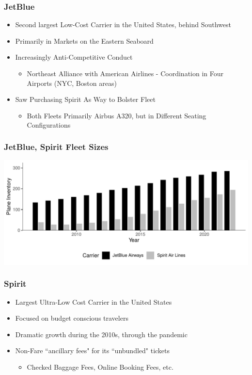 \documentclass[xcolor=dvipsnames]{beamer}
\begin{document}
    \begin{frame}
        \frametitle{JetBlue}
        \begin{itemize}
            \item Second largest Low-Cost Carrier in the United States, behind Southwest
            \item Primarily in Markets on the Eastern Seaboard
            \item Increasingly Anti-Competitive Conduct
            \begin{itemize}
                \item Northeast Alliance with American Airlines - Coordination in Four Airports (NYC, Boston areas)
            \end{itemize}
            \item Saw Purchasing Spirit As Way to Bolster Fleet
            \begin{itemize}
                \item Both Fleets Primarily Airbus A320, but in Different Seating Configurations
            \end{itemize}
        \end{itemize}
    \end{frame}

    \begin{frame}
        \frametitle{JetBlue, Spirit Fleet Sizes}
        \includegraphics[width = \linewidth]{Both_Planes.pdf}
    \end{frame}


    \begin{frame}
        \frametitle{Spirit}
        \begin{itemize}
            \item Largest Ultra-Low Cost Carrier in the United States
            \item Focused on budget conscious travelers
            \item Dramatic growth during the 2010s, through the pandemic
            \item Non-Fare ``ancillary fees" for its ``unbundled" tickets
            \begin{itemize}
                \item Checked Baggage Fees, Online Booking Fees, etc.
            \end{itemize}
        \end{itemize}
    \end{frame}
\end{document}

